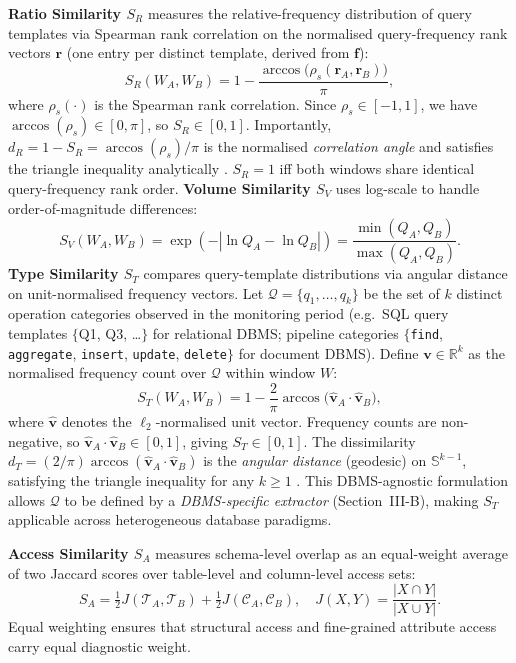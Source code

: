 \documentclass[10pt,journal,compsoc]{IEEEtran}
\newcommand{\SR}{S_{R}}
\newcommand{\SV}{S_{V}}
\newcommand{\ST}{S_{T}}
\newcommand{\SA}{S_{A}}
\begin{document}
\textbf{Ratio Similarity $\SR$} measures the relative-frequency
distribution of query templates via Spearman rank correlation on the
normalised query-frequency rank vectors $\mathbf{r}$ (one entry per
distinct template, derived from $\mathbf{f}$):
\begin{equation}
  \SR(W_A,W_B) = 1 - \frac{\arccos\!\bigl(\rho_s(\mathbf{r}_A,\mathbf{r}_B)\bigr)}{\pi},
\end{equation}
where $\rho_s(\cdot)$ is the Spearman rank correlation.
Since $\rho_s\!\in\![-1,1]$, we have $\arccos(\rho_s)\!\in\![0,\pi]$,
so $\SR\!\in\![0,1]$. Importantly, $d_R\!=\!1\!-\!\SR\!=\!\arccos(\rho_s)/\pi$
is the normalised \emph{correlation angle} and satisfies the triangle
inequality analytically \cite{Deza2009Distances}.
$\SR\!=\!1$ iff both windows share identical query-frequency rank order.
\textbf{Volume Similarity $\SV$} uses log-scale to handle
order-of-magnitude differences:
\begin{equation}
  \SV(W_A,W_B) = \exp(-|\ln Q_A - \ln Q_B|) = \frac{\min(Q_A,Q_B)}{\max(Q_A,Q_B)}.
\end{equation}
\textbf{Type Similarity $\ST$} compares query-template distributions via
angular distance on unit-normalised frequency vectors.
Let $\mathcal{Q}\!=\!\{q_1,\ldots,q_k\}$ be the set of $k$ distinct
operation categories observed in the monitoring period
(e.g.\ SQL query templates $\{$Q1, Q3, \ldots$\}$ for relational DBMS;
pipeline categories $\{$\texttt{find}, \texttt{aggregate},
\texttt{insert}, \texttt{update}, \texttt{delete}$\}$ for document DBMS).
Define $\mathbf{v}\!\in\!\mathbb{R}^k$ as the normalised frequency count
over $\mathcal{Q}$ within window $W$:
\begin{equation}
  \ST(W_A,W_B) = 1 - \frac{2}{\pi}\arccos\!\bigl(\hat{\mathbf{v}}_A\cdot\hat{\mathbf{v}}_B\bigr),
\end{equation}
where $\hat{\mathbf{v}}$ denotes the $\ell_2$-normalised unit vector.
Frequency counts are non-negative, so
$\hat{\mathbf{v}}_A\cdot\hat{\mathbf{v}}_B\!\in\![0,1]$,
giving $\ST\!\in\![0,1]$.
The dissimilarity $d_T\!=\!(2/\pi)\arccos(\hat{\mathbf{v}}_A\cdot\hat{\mathbf{v}}_B)$
is the \emph{angular distance} (geodesic) on $\mathbb{S}^{k-1}$,
satisfying the triangle inequality for any $k\!\geq\!1$
\cite{Deza2009Distances}.
This DBMS-agnostic formulation allows $\mathcal{Q}$ to be defined
by a \emph{DBMS-specific extractor} (Section~III-B), making $\ST$
applicable across heterogeneous database paradigms.

\textbf{Access Similarity $\SA$} measures schema-level overlap as an
equal-weight average of two Jaccard scores over table-level and
column-level access sets:
\begin{equation}
  \SA = \tfrac{1}{2}J(\mathcal{T}_A,\mathcal{T}_B)
       + \tfrac{1}{2}J(\mathcal{C}_A,\mathcal{C}_B),\quad
  J(X,Y)=\frac{|X\cap Y|}{|X\cup Y|}.
\end{equation}
Equal weighting ensures that structural access and fine-grained attribute
access carry equal diagnostic weight.
\end{document}
